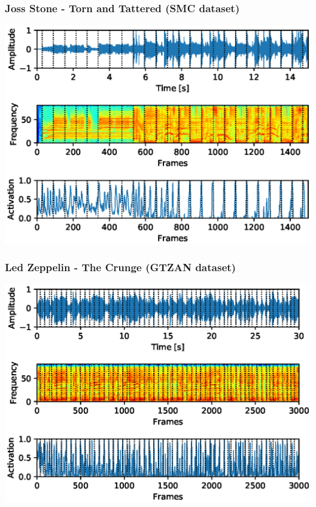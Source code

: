 \documentclass{beamer}
\begin{document}
\begin{frame}
\frametitle{Joss Stone - Torn and Tattered (SMC dataset)}
\begin{minipage}{\textwidth} 
\centering
\includegraphics[scale=0.6]{figures/joss_stone.eps}
\end{minipage}
\end{frame}


\begin{frame}
\frametitle{Led Zeppelin - The Crunge (GTZAN dataset)}
\begin{minipage}{\textwidth} 
\centering
\includegraphics[scale=0.6]{figures/led_zeppelin.eps}
\end{minipage}
\end{frame}
\end{document}
